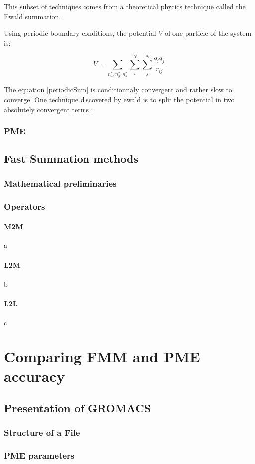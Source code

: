 \documentclass[12pt,twoside,a4paper]{report}
\begin{document}
This subset of techniques comes from a theoretical phycics technique called the Ewald summation.

Using periodic boundary conditions, the potential $V$ of one particle of the system is:

\begin{equation}
	V = \sum_{n_x^*,n_y^*,n_z^*} \sum_{i}^{N} \sum_{j}^{N} \frac{q_i q_j}{r_{ij}}
	\label{periodicSum}
\end{equation}

The equation \ref{periodicSum} is conditionnaly convergent and rather slow to converge. One technique discovered by ewald is to split the potential in two absolutely convergent terms :




\subsection{PME}

\section{Fast Summation methods}
	\subsection{Mathematical preliminaries}
	\subsection{Operators}
		\subsubsection{M2M}
		a
		\subsubsection{L2M}
		b
		\subsubsection{L2L}
		c


\chapter{Comparing FMM and PME accuracy}
\section{Presentation of GROMACS}
	\subsection{Structure of a File}
	\subsection{PME parameters}

\nocite{*}

 
\end{document}
